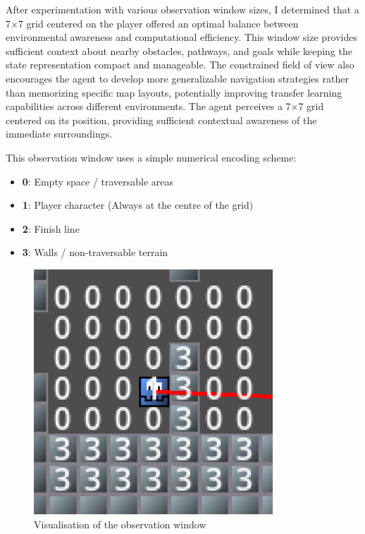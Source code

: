 After experimentation with various observation window sizes, I determined that a 7×7 grid centered on the player offered an optimal balance between environmental awareness and computational efficiency. 
This window size provides sufficient context about nearby obstacles, pathways, and goals while keeping the state representation compact and manageable. 
The constrained field of view also encourages the agent to develop more generalizable navigation strategies rather than memorizing specific map layouts, potentially improving transfer learning capabilities across different environments.
The agent perceives a 7×7 grid centered on its position, providing sufficient contextual awareness of the immediate surroundings.

This observation window uses a simple numerical encoding scheme:
\begin{itemize}
    \item \textbf{0}: Empty space / traversable areas 
    \item \textbf{1}: Player character (Always at the centre of the grid)
    \item \textbf{2}: Finish line
    \item \textbf{3}: Walls / non-traversable terrain
\end{itemize}

\begin{figure}[H]
    \centering
    \includegraphics[width=0.8\textwidth]{figures/observation_window}
    \caption{Visualisation of the observation window}
    \label{fig:observation_window}
\end{figure}

